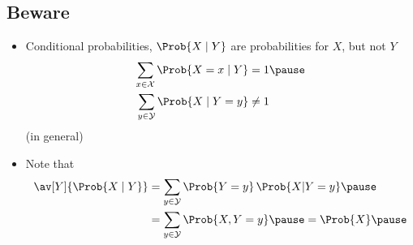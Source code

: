 \begin{slide}
\section[-2]{Beware}

\begin{PauseHighLight}
  \begin{itemize}\squeeze
  \item Conditional probabilities, $\Prob{X\mid Y}$ are probabilities
    for $X$, but not $Y$
    \begin{align*}
      \sum_{x\in\mathcal{X}} \Prob{X=x\mid Y} &= 1 \pause \\
      \sum_{y\in\mathcal{Y}} \Prob{X\mid Y=y} &\neq 1
    \end{align*}
    (in general)\pause
  \item Note that
    \begin{align*}
      \av[Y]{\Prob{X\mid Y}} &= \sum_{y\in\mathcal{Y}} \Prob{Y=y}\,
                               \Prob{X|Y=y}\pause \\
      &= \sum_{y\in\mathcal{Y}} \Prob{X,Y=y}\pause = \Prob{X}\pause
    \end{align*}
  \end{itemize}
\end{PauseHighLight}

\end{slide}

